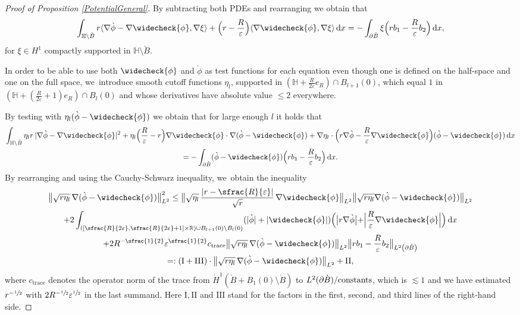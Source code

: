 \documentclass[10pt]{amsart}
\let\epsilon\varepsilon
\let\backslash\setminus
\newcommand{\constants}{\textup{constants}}
\newcommand{\rI}{\mathrm{I}}
\newcommand{\rII}{\mathrm{II}}
\newcommand{\rIII}{\mathrm{III}}
\theoremstyle{definition}
\newcommand\R{\mathbb{R}}
\newcommand\bnorm[1]{\bigl\lVert #1\bigr\rVert}
\newcommand\scalar[2]{\langle #1,#2\rangle}
\newcommand\eq{=}
\newcommand\dd{\,\mathrm{d}}
\newcommand\dx{\dd x}
\let\chek\widecheck
\let\de\partial
\let\eps\epsilon
\begin{document}
\begin{proof}[Proof of Proposition \ref{PotentialGeneral}]

By subtracting both PDEs and rearranging we obtain that
\begin{equation}\label{Elliptic1}
\int_{\mathbb{H}\backslash\grave{B}} r\scalar{\nabla\grave{\phi}-\nabla\chek{\phi}}{\nabla \xi}+\Bigl(r-\frac{R}{\eps}\Bigr)\scalar{\nabla\chek{\phi}}{ \nabla\xi}\dx\eq-\int_{\de\grave{B}} \xi\Bigl(rb_1-\frac{R}{\eps}b_2\Bigr)\dx,
\end{equation}
for $\xi\in H^1$ compactly supported in $\mathbb{H}\backslash\grave{B}$.

In order to be able to use both $\chek{\phi}$ and $\grave{\phi}$ as test functions for each equation even though one is defined on the half-space and one on the full space, we~introduce smooth cutoff functions $\eta_l$, supported in $(\mathbb{H}+\frac{R}{2\eps}e_R)\cap B_{l+1}(0)$, which equal $1$ in \linebreak$(\mathbb{H}+(\frac{R}{2\eps}+1)e_R)\cap B_l(0)$ and whose derivatives have absolute value $\leq 2$ everywhere.

By testing with $\eta_l(\grave{\phi}-\chek{\phi})$ we obtain that for large enough $l$ it holds that
\begin{multline*}
\int_{\mathbb{H}\backslash\grave{B}} \eta_l r\,|\nabla\grave{\phi}-\nabla\chek{\phi}|^2+\eta_l \Bigl(\frac{R}{\eps}-r\Bigr)\nabla\chek{\phi}\cdot \nabla(\grave{\phi}-\chek{\phi})+\nabla\eta_l\cdot\Bigl(r\nabla\grave{\phi}-\frac{R}{\eps}\nabla\chek{\phi}\Bigr)(\grave{\phi}-\chek{\phi}) \dx\\
\eq-\int_{\de\grave{B}}(\grave{\phi}-\chek{\phi})\Bigl(rb_1-\frac{R}{\eps}b_2\Bigr)\dx.
\end{multline*}
By rearranging and using the Cauchy-Schwarz inequality, we~obtain the inequality
\begin{multline*}
\bnorm{\sqrt{r\eta_l}\,\nabla(\grave{\phi}-\chek{\phi})}_{L^2}^2\leq \bnorm{\sqrt{\eta_l}\,\frac{|r-\sfrac{R}{\eps}|}{\sqrt{r}}\,\nabla\chek{\phi}}_{L^2}\bnorm{\sqrt{r\eta_l}\nabla(\grave{\phi}-\chek{\phi})}_{L^2}\\
+2\int_{\left([\sfrac{R}{2\eps},\sfrac{R}{2\eps}+1]\times \R\right)\cup B_{l+1}\left(0\right)\backslash B_l\left(0\right)}(|\grave{\phi}|+|\chek{\phi}|)\Bigl(\bigl|r\nabla\grave{\phi}\bigl|+\Bigl|\frac{R}{\eps}\nabla\chek{\phi}\Bigr|\Bigr)\dx\\
+2R^{-\sfrac{1}{2}}\eps^{\sfrac{1}{2}}c_\mathrm{trace}\bnorm{\sqrt{r\eta_l}\,\nabla(\grave{\phi}-\chek{\phi})}_{L^2}\bnorm{rb_1-\frac{R}{\eps}b_2}_{L^2\left(\de \grave{B}\right)}\\
=: (\rI+\rIII)\cdot \bnorm{\sqrt{r\eta_l}\,\nabla(\grave{\phi}-\chek{\phi})}_{L^2}+\rII,
\end{multline*}
where $c_\mathrm{trace}$ denotes the operator norm of the trace from $\dot{H}^{1}(\grave{B}+B_1(0)\backslash \grave{B})$ to \linebreak $L^2(\de \grave{B})/\constants$, which is $\lesssim 1$ and we have estimated $r^{-\sfrac{1}{2}}$ with $2R^{-\sfrac{1}{2}}\eps^{\sfrac{1}{2}}$ in the last summand. Here $\rI,\rII$ and $\rIII$ stand for the factors in the first, second, and third lines of the right-hand side.


\end{proof}
\end{document}
